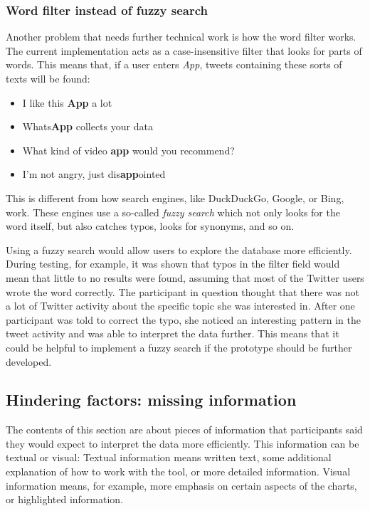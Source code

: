 \subsubsection*{Word filter instead of fuzzy search}
Another problem that needs further technical work is how the word filter works. The current implementation acts as a case-insensitive filter that looks for parts of words. This means that, if a user enters \emph{App}, tweets containing these sorts of texts will be found:

\begin{itemize}
    \item I like this \textbf{App} a lot
    \item Whats\textbf{App} collects your data
    \item What kind of video \textbf{app} would you recommend?
    \item I'm not angry, just dis\textbf{app}ointed
\end{itemize}

This is different from how search engines, like DuckDuckGo, Google, or Bing, work. These engines use a so-called \emph{fuzzy search} which not only looks for the word itself, but also catches typos, looks for synonyms, and so on.

Using a fuzzy search would allow users to explore the database more efficiently. During testing, for example, it was shown that typos in the filter field would mean that little to no results were found, assuming that most of the Twitter users wrote the word correctly. The participant in question thought that there was not a lot of Twitter activity about the specific topic she was interested in. After one participant was told to correct the typo, she noticed an interesting pattern in the tweet activity and was able to interpret the data further. This means that it could be helpful to implement a fuzzy search if the prototype should be further developed.

\subsection{Hindering factors: missing information}
The contents of this section are about pieces of information that participants said they would expect to interpret the data more efficiently. This information can be textual or visual: Textual information means written text, some additional explanation of how to work with the tool, or more detailed information. Visual information means, for example, more emphasis on certain aspects of the charts, or highlighted information.

